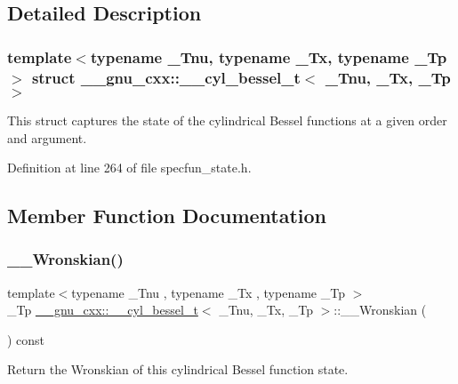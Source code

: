 \subsection{Detailed Description}
\subsubsection*{template$<$typename \+\_\+\+Tnu, typename \+\_\+\+Tx, typename \+\_\+\+Tp$>$\newline
struct \+\_\+\+\_\+gnu\+\_\+cxx\+::\+\_\+\+\_\+cyl\+\_\+bessel\+\_\+t$<$ \+\_\+\+Tnu, \+\_\+\+Tx, \+\_\+\+Tp $>$}

This struct captures the state of the cylindrical Bessel functions at a given order and argument. 

Definition at line 264 of file specfun\+\_\+state.\+h.



\subsection{Member Function Documentation}
\mbox{\label{struct____gnu__cxx_1_1____cyl__bessel__t_aa311a0f4636243a07d0c1d0660e5c213}} 
\subsubsection{\texorpdfstring{\+\_\+\+\_\+\+Wronskian()}{\_\_Wronskian()}}
{\footnotesize\ttfamily template$<$typename \+\_\+\+Tnu , typename \+\_\+\+Tx , typename \+\_\+\+Tp $>$ \\
\+\_\+\+Tp \hyperlink{struct____gnu__cxx_1_1____cyl__bessel__t}{\+\_\+\+\_\+gnu\+\_\+cxx\+::\+\_\+\+\_\+cyl\+\_\+bessel\+\_\+t}$<$ \+\_\+\+Tnu, \+\_\+\+Tx, \+\_\+\+Tp $>$\+::\+\_\+\+\_\+\+Wronskian (\begin{DoxyParamCaption}{ }\end{DoxyParamCaption}) const\hspace{0.3cm}{\ttfamily [inline]}}



Return the Wronskian of this cylindrical Bessel function state. 



